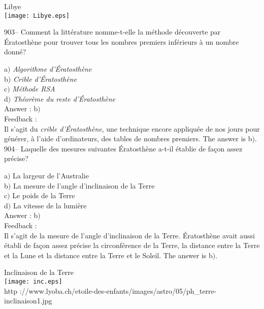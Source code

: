 ﻿\documentclass[letterpaper, 12pt]{article}
\begin{document}
        \begin{center}
        Libye\\
    \texttt{[image: Libye.eps]}\\
    \end{center}

903-- Comment la litt\'erature nomme-t-elle la m\'ethode d\'ecouverte par
\'Eratosth\`ene pour trouver
tous les nombres premiers inf\'erieurs \`a un nombre donn\'e?

a$)$ {\sl Algorithme d'\'Eratosth\`ene} \\
b$)$ {\sl Crible d'\'Eratosth\`ene} \\
c$)$ {\sl M\'ethode RSA} \\
d$)$ {\sl Th\'eor\`eme du reste d'\'Eratosth\`ene}\\

Answer : b$)$\\

Feedback : \\
Il s'agit du {\sl crible d'\'Eratosth\`ene}, une technique encore
appliqu\'ee de nos jours
pour g\'en\'erer, \`a l'aide d'ordinateurs, des tables de nombres premiers.
The answer is b$)$.\\

904-- Laquelle des mesures suivantes \'Eratosth\`ene a-t-il
\'etablie de fa\c con assez pr\'ecise?

a$)$ La largeur de l'Australie \\
b$)$ La mesure de l'angle d'inclinaison de la Terre \\
c$)$ Le poids de la Terre \\
d$)$ La vitesse de la lumi\`ere\\

Answer : b$)$\\

Feedback :\\
Il s'agit de la mesure de l'angle d'inclinaison de la Terre.
\'Eratosth\`ene avait aussi \'etabli de fa\c con assez pr\'ecise la
circonf\'erence de la Terre, la distance entre la Terre et la Lune
et la distance entre la
Terre et le Soleil. The answer is b$)$.\\

        \begin{center}
        Inclinaison de la Terre\\
    \texttt{[image: inc.eps]}\\
        {\footnotesize http
://www.lyoba.ch/etoile-des-enfants/images/astro/05/ph\_terre-inclinaison1.jpg}
    \end{center}
\end{document}
